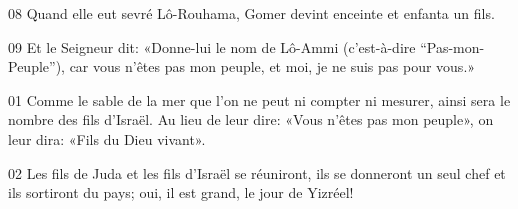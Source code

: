 
08 Quand elle eut sevré Lô-Rouhama, Gomer devint enceinte et enfanta un fils.

09 Et le Seigneur dit: «Donne-lui le nom de Lô-Ammi (c’est-à-dire “Pas-mon-Peuple”), car vous n’êtes pas mon peuple, et moi, je ne suis pas pour vous.»

01 Comme le sable de la mer que l’on ne peut ni compter ni mesurer, ainsi sera le nombre des fils d’Israël. Au lieu de leur dire: «Vous n’êtes pas mon peuple», on leur dira: «Fils du Dieu vivant».

02 Les fils de Juda et les fils d’Israël se réuniront, ils se donneront un seul chef et ils sortiront du pays; oui, il est grand, le jour de Yizréel!

